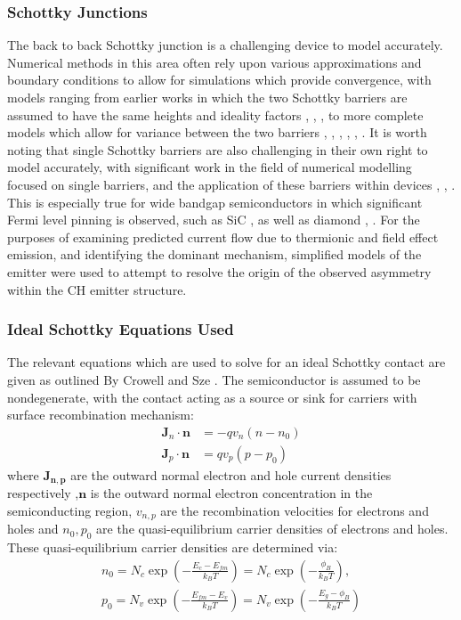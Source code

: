 \begin{refsection}
\subsubsection{Schottky Junctions}
The back to back Schottky junction is a challenging device to model accurately. Numerical methods in this area often rely upon various approximations and boundary conditions to allow for simulations which provide convergence, with models ranging from earlier works in which the two Schottky barriers are assumed to have the same heights and ideality factors \cite{Nam2005}, \cite{Ramirez2006}, \cite{Nagano2007}, to more complete models which allow for variance between the two barriers \cite{Nouchi2014}, \cite{Wang2020}, \cite{Grillo2020}, \cite{DiBartolomeo2018}, \cite{DiBartolomeo2019}, \cite{DiBartolomeo20192}. It is worth noting that single Schottky barriers are also challenging in their own right to model accurately, with significant work in the field of numerical modelling focused on single barriers, and the application of these barriers within devices \cite{Furno2007}, \cite{Wu2022}, \cite{Splith2021}. This is especially true for wide bandgap semiconductors in which significant Fermi level pinning is observed, such as SiC \cite{Baum2022}, as well as diamond \cite{Wang2022}, \cite{Han2023}. For the purposes of examining predicted current flow due to thermionic and field effect emission, and identifying the dominant mechanism, simplified models of the emitter were used to attempt to resolve the origin of the observed asymmetry within the CH emitter structure.

\subsubsection{Ideal Schottky Equations Used}
The relevant equations which are used to solve for an ideal Schottky contact are given as outlined By Crowell \cite{crowell:1966} and Sze \cite{sze2006}. The semiconductor is assumed to be nondegenerate, with the contact acting as a source or sink for carriers with surface recombination mechanism:
\begin{align}
    \bm{J}_{n} \cdot \bm{n} &= -q v_{n} (n - n_{0}) \\
    \bm{J}_{p} \cdot \bm{n} &= q v_{p} (p - p_{0})
\end{align}
where $\bm{J_{n,p}}$ are the outward normal electron and hole current densities respectively ,$\bm{n}$ is the outward normal electron concentration in the semiconducting region, $v_{n,p}$ are the recombination velocities for electrons and holes and $n_{0}, p_{0}$ are the quasi-equilibrium carrier densities of electrons and holes. These quasi-equilibrium carrier densities are determined via:
\begin{align}
    n_0 = N_{c} \exp \left( -\frac{E_{c} - E_{fm}}{k_{B} T} \right) = N_{c} \exp \left( -\frac{\phi_{B}}{k_{B} T} \right), \\
    p_0 = N_{v} \exp \left( -\frac{E_{fm} - E_{v}}{k_{B} T} \right) = N_{v} \exp \left( -\frac{E_{g} - \phi_B}{k_{B} T} \right)
\end{align}


\end{refsection}
